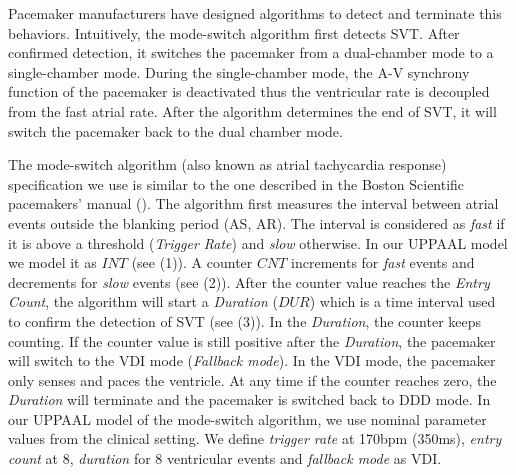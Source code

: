 Pacemaker manufacturers have designed algorithms to detect and terminate this behaviors. Intuitively, the mode-switch algorithm first detects SVT. After confirmed detection, it switches the pacemaker from a dual-chamber mode to a single-chamber mode. During the single-chamber mode, the A-V synchrony function of the pacemaker is deactivated thus the ventricular rate is decoupled from the fast atrial rate. After the algorithm determines the end of SVT, it will switch the pacemaker back to the dual chamber mode. 

The mode-switch algorithm (also known as atrial tachycardia response) specification we use is similar to the one described in the Boston Scientific pacemakers' manual (\cite{compass}). The algorithm first measures the interval between atrial events outside the blanking period (AS, AR). The interval is considered as \emph{fast} if it is above a threshold (\emph{Trigger Rate}) and \emph{slow} otherwise. In our UPPAAL model we model it as $INT$ (see  (1)). A counter $CNT$ increments for \emph{fast} events and decrements for \emph{slow} events (see  (2)). After the counter value reaches the \emph{Entry Count}, the algorithm will start a \emph{Duration} ($DUR$) which is a time interval used to confirm the detection of SVT (see  (3)). In the \emph{Duration}, the counter keeps counting. If the counter value is still positive after the \emph{Duration}, the pacemaker will switch to the VDI mode (\emph{Fallback mode}). In the VDI mode, the pacemaker only senses and paces the ventricle. At any time if the counter reaches zero, the \emph{Duration} will terminate and the pacemaker is switched back to DDD mode.
In our UPPAAL model of the mode-switch algorithm, we use nominal parameter values from the clinical setting. We define \emph{trigger rate} at 170bpm (350ms), \emph{entry count} at 8, \emph{duration} for 8 ventricular events and \emph{fallback mode} as VDI. 


